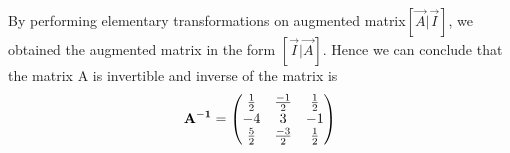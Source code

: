     By performing elementary transformations on augmented matrix$ [\vec{A} | \vec{I}]$, we obtained the augmented matrix in the form $ [\vec{I} | \vec{A}]$. 
    Hence we can conclude that the matrix A is invertible and inverse of the matrix is
    \begin{align}
\mathbf{A^{-1}}=\begin{pmatrix}  \frac{1}{2} & \frac{-1}{2} & \frac{1}{2} \\  -4 & 3 & -1\\ \frac{5}{2} &\frac{-3}{2} &\frac{1}{2}\end{pmatrix}
    \end{align}
